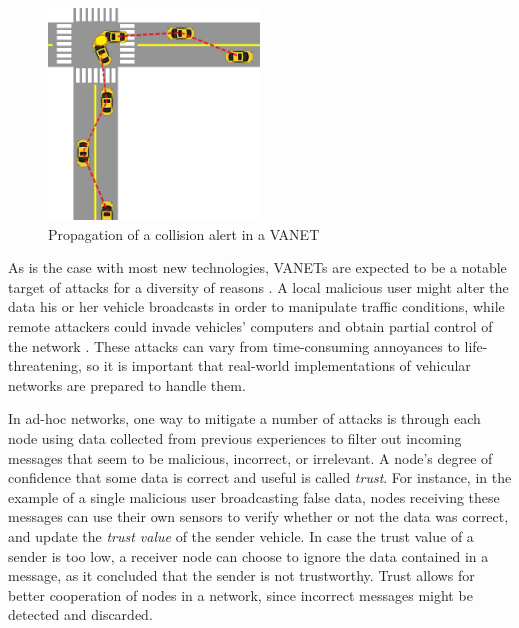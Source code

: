 \begin{figure}[h]
    \centering
    \includegraphics[width=0.5\textwidth]{images/collision.png}
    \caption{Propagation of a collision alert in a VANET}
    \label{fig:collision}
\end{figure}

As is the case with most new technologies, VANETs are expected to be a notable target of attacks for a diversity of reasons \citep{isaac2010security}.
A local malicious user might alter the data his or her vehicle broadcasts in order to manipulate traffic conditions, while remote attackers could invade vehicles' computers and obtain partial control of the network  \citep{garip2015congestion}.
These attacks can vary from time-consuming annoyances to life-threatening, so it is important that real-world implementations of vehicular networks are prepared to handle them.




In ad-hoc networks, one way to mitigate a number of attacks is through each node using data collected from previous experiences to filter out incoming messages that seem to be malicious, incorrect, or irrelevant.
A node's degree of confidence that some data is correct and useful is called \textit{trust}.
For instance, in the example of a single malicious user broadcasting false data, nodes receiving these messages can use their own sensors to verify whether or not the data was correct, and update the \textit{trust value} of the sender vehicle.
In case the trust value of a sender is too low, a receiver node can choose to ignore the data contained in a message, as it concluded that the sender is not trustworthy.
Trust allows for better cooperation of nodes in a network, since incorrect messages might be detected and discarded.

